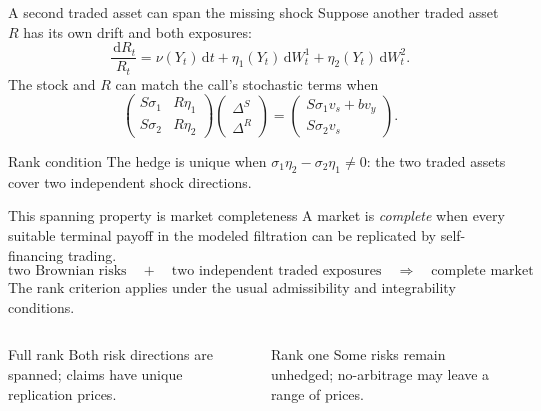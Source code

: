 \documentclass[handout,10pt,aspectratio=169]{beamer}
\newcommand{\dd}{\,\mathrm d}
\newcommand{\1}{\mathbf 1}
\begin{document}
\begin{frame}{A second traded asset can span the missing shock}
Suppose another traded asset \(R\) has its own drift and both exposures:
\[
\frac{\dd R_t}{R_t}
=\nu(Y_t)\dd t+\eta_1(Y_t)\dd W_t^1+\eta_2(Y_t)\dd W_t^2.
\]
The stock and \(R\) can match the call's stochastic terms when
\[
\begin{pmatrix}
S\sigma_1 & R\eta_1\\ S\sigma_2 & R\eta_2
\end{pmatrix}
\begin{pmatrix}\Delta^S\\\Delta^R\end{pmatrix}
=\begin{pmatrix}S\sigma_1v_s+bv_y\\S\sigma_2v_s\end{pmatrix}.
\]
\begin{block}{Rank condition}
The hedge is unique when \(\sigma_1\eta_2-\sigma_2\eta_1\neq0\): the two
traded assets cover two independent shock directions.
\end{block}
\end{frame}

\begin{frame}{This spanning property is market completeness}
A market is \emph{complete} when every suitable terminal payoff in the
modeled filtration can be replicated by self-financing trading.
\[
\boxed{\text{two Brownian risks}
\quad+\quad\text{two independent traded exposures}
\quad\Longrightarrow\quad\text{complete market}}
\]
The rank criterion applies under the usual admissibility and integrability
conditions.
\begin{columns}[T,onlytextwidth]
\begin{exampleblock}{Full rank}
Both risk directions are spanned; claims have unique replication prices.
\end{exampleblock}
\begin{alertblock}{Rank one}
Some risks remain unhedged; no-arbitrage may leave a range of prices.
\end{alertblock}
\end{columns}
\end{frame}
\end{document}
